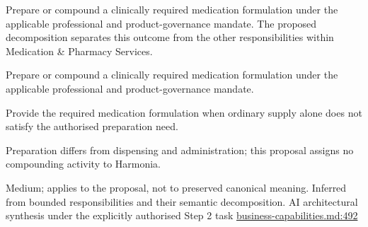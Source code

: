 Prepare or compound a clinically required medication formulation under the applicable professional and product-governance mandate. The proposed decomposition separates this outcome from the other responsibilities within Medication \& Pharmacy Services.



Prepare or compound a clinically required medication formulation under the applicable professional and product-governance mandate.



Provide the required medication formulation when ordinary supply alone does not satisfy the authorised preparation need.



Preparation differs from dispensing and administration; this proposal assigns no compounding activity to Harmonia.


Medium; applies to the proposal, not to preserved canonical meaning.
Inferred from bounded responsibilities and their semantic decomposition. AI architectural synthesis under the explicitly authorised Step 2 task \hyperref[evidence:a4c0900c47c945d9]{business-capabilities.md:492}
